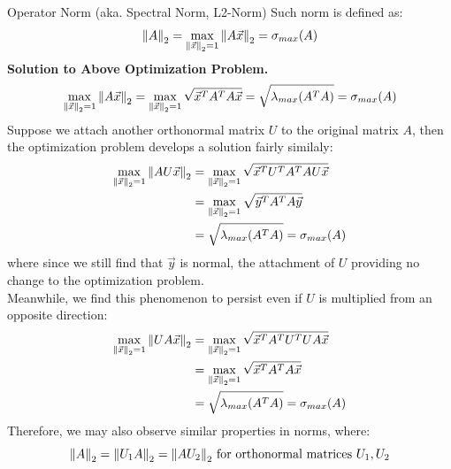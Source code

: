 \begin{ln-define}{Operator Norm (aka. Spectral Norm, L2-Norm)}{}
    Such norm is defined as:
    \[
        {\| A \|}_{2}^{} = \max_{{\| \vec{x} \|}_{2}^{} = 1} {\| A \vec{x} \|}_{2}^{} = \sigma_{max}(A)
    \]
    \tcblower
    \textbf{Solution to Above Optimization Problem.}
    \begin{align*}
        \max_{{\| \vec{x} \|}_{2}^{} = 1} {\| A \vec{x} \|}_{2}^{}
        = \max_{{\| \vec{x} \|}_{2}^{} = 1} \sqrt{\vec{x}^T A^T A \vec{x}}
        = \sqrt{\lambda_{max}(A^T A)} = \sigma_{max}(A)
    \end{align*}
    Suppose we attach another orthonormal matrix $U$ to the original matrix $A$, then the optimization problem develops a solution fairly similaly:
    \begin{align*}
        \max_{{\| \vec{x} \|}_{2}^{} = 1} {\| AU \vec{x} \|}_{2}^{}
        &= \max_{{\| \vec{x} \|}_{2}^{} = 1} \sqrt{\vec{x}^T U^T A^T A U \vec{x}} \\
        &= \max_{{\| \vec{x} \|}_{2}^{} = 1} \sqrt{\vec{y}^T A^T A \vec{y}} \\
        &= \sqrt{\lambda_{max}(A^T A)} = \sigma_{max}(A)
    \end{align*}
    where since we still find that $\vec{y}$ is normal, the attachment of $U$ providing no change to the optimization problem. \\
    Meanwhile, we find this phenomenon to persist even if $U$ is multiplied from an opposite direction:
    \begin{align*}
        \max_{{\| \vec{x} \|}_{2}^{} = 1} {\| UA \vec{x} \|}_{2}^{}
        &= \max_{{\| \vec{x} \|}_{2}^{} = 1} \sqrt{\vec{x}^T A^T U^T U A \vec{x}} \\
        &= \max_{{\| \vec{x} \|}_{2}^{} = 1} \sqrt{\vec{x}^T A^T A \vec{x}} \\
        &= \sqrt{\lambda_{max}(A^T A)} = \sigma_{max}(A)
    \end{align*}
    Therefore, we may also observe similar properties in norms, where:
    \[
        {\| A \|}_{2}^{} = {\| U_1A \|}_{2}^{} = {\| AU_2 \|}_{2}^{} \text{ for orthonormal matrices } U_1, U_2
    \]
\end{ln-define}

